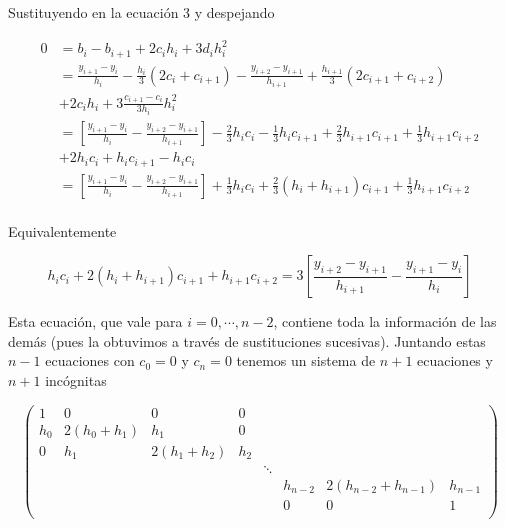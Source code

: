 Sustituyendo en la ecuación 3 y despejando

\begin{align*}
0 & = b_i - b_{i + 1} + 2c_ih_{i} + 3d_i h_{i}^2\\
    & = \frac{y_{i + 1} - y_i}{h_{i}} - \frac{h_{i}}{3}\left(2c_i + c_{i + 1}\right) -
        \frac{y_{i + 2} - y_{i + 1}}{h_{i + 1}} + \frac{h_{i + 1}}{3}\left(2c_{i + 1} + c_{i + 2}\right)\\
        & +2c_ih_{i} + 3\frac{c_{i + 1} - c_i}{3 h_{i}} h_{i}^2\\
    & = \left[\frac{y_{i + 1} - y_i}{h_{i}} - \frac{y_{i + 2} - y_{i + 1}}{h_{i + 1}}\right]
         - \frac{2}{3} h_{i} c_i - \frac{1}{3} h_{i} c_{i + 1} + \frac{2}{3} h_{i + 1} c_{i + 1} + \frac{1}{3} h_{i + 1} c_{i + 2}\\
        & + 2h_{i} c_i + h_{i} c_{i + 1} - h_{i}c_i\\
    & = \left[\frac{y_{i + 1} - y_i}{h_{i}} - \frac{y_{i + 2} - y_{i + 1}}{h_{i + 1}}\right]
         + \frac{1}{3}h_i c_i + \frac{2}{3} (h_i + h_{i + 1}) c_{i + 1} + \frac{1}{3}h_{i + 1} c_{i + 2}\\
\end{align*}

Equivalentemente

\[h_i c_i + 2 (h_i + h_{i + 1}) c_{i + 1} + h_{i + 1} c_{i + 2} = 
3 \left[\frac{y_{i + 2} - y_{i + 1}}{h_{i + 1}} - \frac{y_{i + 1} - y_i}{h_{i}}\right]
\]

Esta ecuación, que vale para $i = 0, \cdots, n - 2$, contiene toda la información de las demás (pues la obtuvimos a través de sustituciones sucesivas). Juntando estas $n - 1$ ecuaciones con $c_0 = 0$ y $c_n = 0$ tenemos un sistema de $n + 1$ ecuaciones y $n + 1$ incógnitas

\[
\begin{pmatrix}
1       & 0                 & 0                 & 0             &           &           &                           &           \\
h_0         & 2(h_0 + h_1)  & h_1           & 0             &           &           &                           &           \\
0       & h_1           & 2(h_1 + h_2)  & h_2       &           &           &                           &           \\
        &               &               &           & \ddots        &           &                           &           \\
        &               &               &           &           & h_{n - 2} & 2(h_{n - 2} + h_{n - 1})  & h_{n - 1}\\
        &               &               &           &           &   0       &           0               & 1         \\
\end{pmatrix}\]

